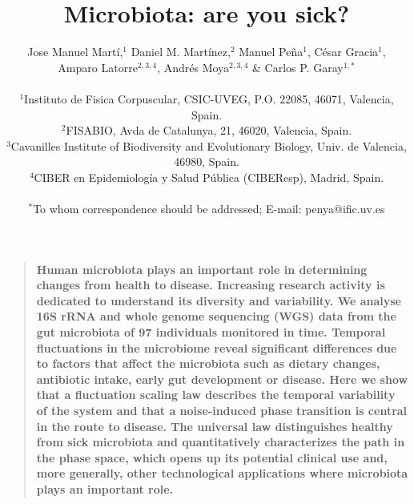 \documentclass[12pt]{article}
\title{Microbiota: are you sick?}
\author
{Jose Manuel Mart\'i,$^{1}$ Daniel M. Mart\'inez,$^{2}$ Manuel Pe\~na$^{1}$, C\'esar Gracia$^{1}$, \\
Amparo Latorre$^{2,3,4}$, Andr\'es Moya$^{2,3,4}$ \& Carlos P. Garay$^{1,\ast}$\\
\\
\normalsize{$^{1}$Instituto de Fisica Corpuscular, CSIC-UVEG, P.O.  22085, 46071, Valencia, Spain.}\\
\normalsize{$^{2}$FISABIO, Avda de Catalunya, 21, 46020, Valencia, Spain.}\\
\normalsize{$^{3}$Cavanilles Institute of Biodiversity and Evolutionary Biology, Univ. de Valencia, 46980, Spain.}\\
\normalsize{$^{4}$CIBER en Epidemiolog\' ia y Salud P\'ublica (CIBEResp), Madrid, Spain.}\\
\\
\normalsize{$^\ast$To whom correspondence should be addressed; E-mail:  penya@ific.uv.es}
}
\date{}
\newenvironment{sciabstract}{%
\begin{quote} \bf}
{\end{quote}}
\begin{document}
 


\baselineskip24pt


\maketitle 




\begin{sciabstract}
Human microbiota plays an important role in determining changes from health to disease. Increasing research activity is dedicated to understand its diversity and variability. 
We analyse 16S rRNA and whole genome sequencing (WGS) data from the gut microbiota of 97 individuals monitored in time. Temporal fluctuations in the microbiome reveal 
significant differences due to factors that affect the microbiota such as dietary changes, antibiotic intake, early gut development or disease. Here we show that a fluctuation 
scaling law describes the temporal variability of the system and that a noise-induced phase transition is central in the route to disease. The universal law distinguishes healthy 
from sick microbiota and quantitatively characterizes the path in the phase space, which opens up its potential clinical use and, more generally, other technological 
applications where microbiota plays an important role. 
\end{sciabstract}



\end{document}
